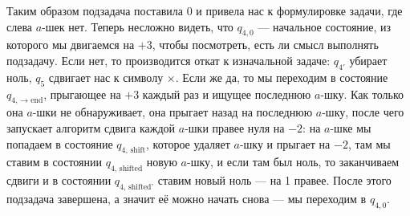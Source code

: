 \documentclass[12pt,a4paper]{article}
\begin{document}
\begin{enumproblem}
\begin{enumerate}
                Таким образом подзадача поставила $0$ и привела нас к формулировке задачи, где слева $a$-шек нет. Теперь несложно видеть, что $q_{4, 0}$ --- начальное состояние, из которого мы двигаемся на $+3$, чтобы посмотреть, есть ли смысл выполнять подзадачу. Если нет, то производится откат к изначальной задаче: $q_{4'}$ убирает ноль, $q_5$ сдвигает нас к символу $\times$. Если же да, то мы переходим в состояние $q_{\text{4, $\to$ end}}$, прыгающее на $+3$ каждый раз и ищущее последнюю $a$-шку. Как только она $a$-шки не обнаруживает, она прыгает назад на последнюю $a$-шку, после чего запускает алгоритм сдвига каждой $a$-шки правее нуля на $-2$: на $a$-шке мы попадаем в состояние $q_{\text{4, shift}}$, которое удаляет $a$-шку и прыгает на $-2$, там мы ставим в состоянии $q_{\text{4, shifted}}$ новую $a$-шку, и если там был ноль, то заканчиваем сдвиги и в состоянии $q_{\text{4, shifted'}}$ ставим новый ноль --- на 1 правее. После этого подзадача завершена, а значит её можно начать снова --- мы переходим в $q_{4, 0}$.
        \end{enumerate}


\end{enumproblem}
\end{document}
